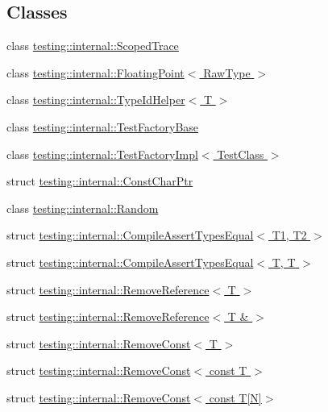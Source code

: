 \subsection*{Classes}
\begin{DoxyCompactItemize}
\item 
class \hyperlink{classtesting_1_1internal_1_1_scoped_trace}{testing\+::internal\+::\+Scoped\+Trace}
\item 
class \hyperlink{classtesting_1_1internal_1_1_floating_point}{testing\+::internal\+::\+Floating\+Point$<$ Raw\+Type $>$}
\item 
class \hyperlink{classtesting_1_1internal_1_1_type_id_helper}{testing\+::internal\+::\+Type\+Id\+Helper$<$ T $>$}
\item 
class \hyperlink{classtesting_1_1internal_1_1_test_factory_base}{testing\+::internal\+::\+Test\+Factory\+Base}
\item 
class \hyperlink{classtesting_1_1internal_1_1_test_factory_impl}{testing\+::internal\+::\+Test\+Factory\+Impl$<$ Test\+Class $>$}
\item 
struct \hyperlink{structtesting_1_1internal_1_1_const_char_ptr}{testing\+::internal\+::\+Const\+Char\+Ptr}
\item 
class \hyperlink{classtesting_1_1internal_1_1_random}{testing\+::internal\+::\+Random}
\item 
struct \hyperlink{structtesting_1_1internal_1_1_compile_assert_types_equal}{testing\+::internal\+::\+Compile\+Assert\+Types\+Equal$<$ T1, T2 $>$}
\item 
struct \hyperlink{structtesting_1_1internal_1_1_compile_assert_types_equal_3_01_t_00_01_t_01_4}{testing\+::internal\+::\+Compile\+Assert\+Types\+Equal$<$ T, T $>$}
\item 
struct \hyperlink{structtesting_1_1internal_1_1_remove_reference}{testing\+::internal\+::\+Remove\+Reference$<$ T $>$}
\item 
struct \hyperlink{structtesting_1_1internal_1_1_remove_reference_3_01_t_01_6_01_4}{testing\+::internal\+::\+Remove\+Reference$<$ T \& $>$}
\item 
struct \hyperlink{structtesting_1_1internal_1_1_remove_const}{testing\+::internal\+::\+Remove\+Const$<$ T $>$}
\item 
struct \hyperlink{structtesting_1_1internal_1_1_remove_const_3_01const_01_t_01_4}{testing\+::internal\+::\+Remove\+Const$<$ const T $>$}
\item 
struct \hyperlink{structtesting_1_1internal_1_1_remove_const_3_01const_01_t[_n]_4}{testing\+::internal\+::\+Remove\+Const$<$ const T\mbox{[}\+N\mbox{]}$>$}

\end{DoxyCompactItemize}

